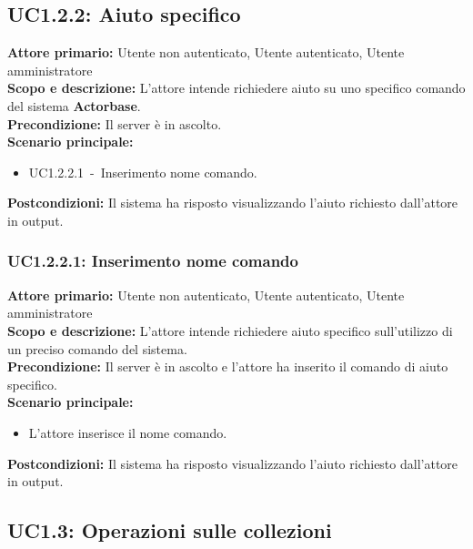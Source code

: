 \documentclass{scalatekids-article}
\begin{document}
\subsection{UC1.2.2: Aiuto specifico}

\textbf{Attore primario:} Utente non autenticato, Utente autenticato, Utente amministratore\\
\textbf{Scopo e descrizione:} L'attore intende richiedere aiuto su uno specifico comando del sistema \textbf{Actorbase}.\\
\textbf{Precondizione:} Il server è in ascolto.\\
\textbf{Scenario principale:}
\begin{itemize}
\item UC1.2.2.1\ -\ Inserimento nome comando.
\end{itemize}
\textbf{Postcondizioni:} Il sistema ha risposto visualizzando l'aiuto richiesto dall'attore in output.

\subsubsection{UC1.2.2.1: Inserimento nome comando}

\textbf{Attore primario:} Utente non autenticato, Utente autenticato, Utente amministratore\\
\textbf{Scopo e descrizione:} L'attore intende richiedere aiuto specifico sull'utilizzo di un preciso comando del sistema.\\
\textbf{Precondizione:} Il server è in ascolto e l'attore ha inserito il comando di aiuto specifico.\\
\textbf{Scenario principale:}
\begin{itemize}
\item L'attore inserisce il nome comando. %
\end{itemize}
\textbf{Postcondizioni:} Il sistema ha risposto visualizzando l'aiuto richiesto dall'attore in output.

\subsection{UC1.3: Operazioni sulle collezioni}
\end{document}
